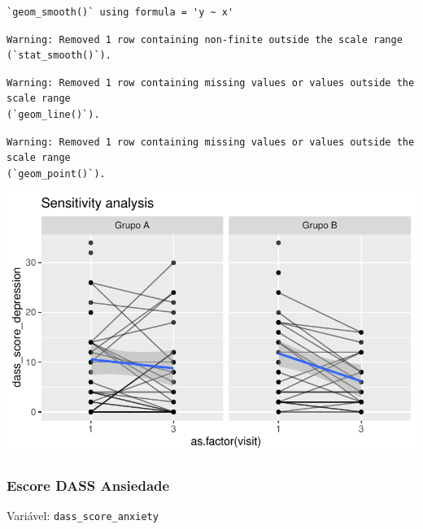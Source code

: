 \documentclass[
  letterpaper,
  DIV=11,
  numbers=noendperiod]{scrartcl}
\begin{document}
\begin{verbatim}
`geom_smooth()` using formula = 'y ~ x'
\end{verbatim}

\begin{verbatim}
Warning: Removed 1 row containing non-finite outside the scale range
(`stat_smooth()`).
\end{verbatim}

\begin{verbatim}
Warning: Removed 1 row containing missing values or values outside the scale range
(`geom_line()`).
\end{verbatim}

\begin{verbatim}
Warning: Removed 1 row containing missing values or values outside the scale range
(`geom_point()`).
\end{verbatim}

\includegraphics{Outcomes_V1V2V3_files/figure-pdf/dass_score_depression_6-2.pdf}

\subsubsection{Escore DASS Ansiedade}\label{escore-dass-ansiedade}

Variável: \texttt{dass\_score\_anxiety}
\end{document}
